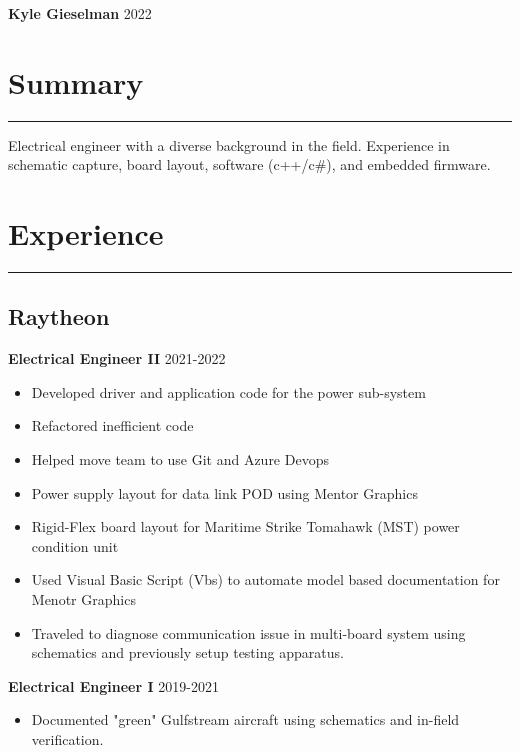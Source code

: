 \documentclass[10pt, letterpaper]{article}
\begin{document}
\textbf{Kyle Gieselman} \hfill 2022


\section*{Summary} \vspace{-2ex} \hrule
\vspace{1ex}

Electrical engineer with a diverse background in the field. Experience in schematic
capture, board layout, software (c++/c\#), and embedded firmware.



\section*{Experience} \vspace{-2ex} \hrule
\vspace{1ex}

\subsection*{Raytheon}

\textbf{Electrical Engineer II} \hfill 2021-2022 \\
\vspace{-4ex}
\begin{itemize}[noitemsep]
    \item Developed driver and application code for the power sub-system
    \item Refactored inefficient code
    \item Helped move team to use Git and Azure Devops
    \item Power supply layout for data link POD using Mentor Graphics
    \item Rigid-Flex board layout for Maritime Strike Tomahawk (MST) power condition unit
    \item Used Visual Basic Script (Vbs) to automate model based documentation for Menotr Graphics
    \item Traveled to diagnose communication issue in multi-board system using schematics and previously setup testing apparatus.
\end{itemize}

\textbf{Electrical Engineer I} \hfill 2019-2021 \\
\vspace{-4ex}
\begin{itemize}
    \item Documented "green" Gulfstream aircraft using schematics and in-field verification.
\end{itemize}
\end{document}
